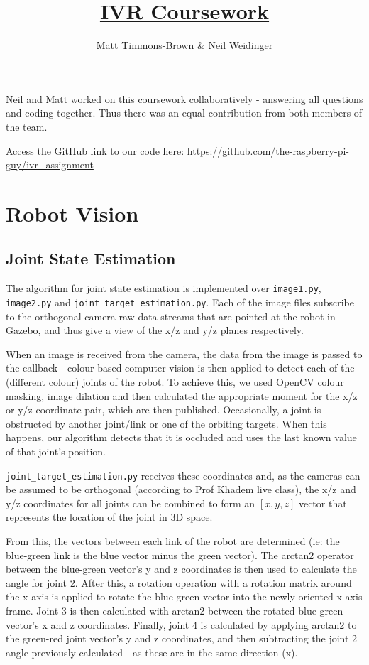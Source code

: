 \documentclass[11pt]{article}
\title{\underline{IVR Coursework}}
\author{Matt Timmons-Brown \& Neil Weidinger}
\begin{document}
\maketitle

Neil and Matt worked on this coursework collaboratively - answering all questions and coding together. Thus there was an equal contribution from both members of the team.

Access the GitHub link to our code here: \url{https://github.com/the-raspberry-pi-guy/ivr_assignment}

\setcounter{section}{1}
\section{Robot Vision}

\subsection{Joint State Estimation}

The algorithm for joint state estimation is implemented over \texttt{image1.py}, \texttt{image2.py} and \texttt{joint\_target\_estimation.py}. Each of the image files subscribe to the orthogonal camera raw data streams that are pointed at the robot in Gazebo, and thus give a view of the x/z and y/z planes respectively. 

When an image is received from the camera, the data from the image is passed to the callback - colour-based computer vision is then applied to detect each of the (different colour) joints of the robot. To achieve this, we used OpenCV colour masking, image dilation and then calculated the appropriate moment for the x/z or y/z coordinate pair, which are then published. Occasionally, a joint is obstructed by another joint/link or one of the orbiting targets. When this happens, our algorithm detects that it is occluded and uses the last known value of that joint's position.

\texttt{joint\_target\_estimation.py} receives these coordinates and, as the cameras can be assumed to be orthogonal (according to Prof Khadem live class), the x/z and y/z coordinates for all joints can be combined to form an $[x,y,z]$ vector that represents the location of the joint in 3D space.

From this, the vectors between each link of the robot are determined (ie: the blue-green link is the blue vector minus the green vector). The arctan2 operator between the blue-green vector's y and z coordinates is then used to calculate the angle for joint 2. After this, a rotation operation with a rotation matrix around the x axis is applied to rotate the blue-green vector into the newly oriented x-axis frame. Joint 3 is then calculated with arctan2 between the rotated blue-green vector's x and z coordinates. Finally, joint 4 is calculated by applying arctan2 to the green-red joint vector's y and z coordinates, and then subtracting the joint 2 angle previously calculated - as these are in the same direction (x).
\end{document}
